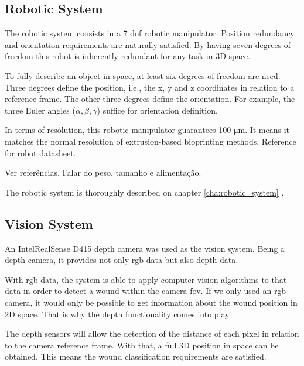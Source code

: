 \subsection*{Robotic System}
\label{subsec:system_architecture_components_robotic_system}

The robotic system consists in a 7 \gls{dof} robotic manipulator. Position redundancy and orientation requirements are naturally satisfied. By having seven degrees of freedom this robot is inherently redundant for any task in 3D space.

To fully describe an object in space, at least six degrees of freedom are need. Three degrees define the position, i.e., the x, y and z coordinates in relation to a reference frame. The other three degrees define the orientation. For example, the three Euler angles ($\alpha, \beta, \gamma$) suffice for orientation definition.

In terms of resolution, this robotic manipulator guarantees 100 \si{\micro\meter}. It means it matches the normal resolution of extrusion-based bioprinting methods. {\color{red}Reference for robot datasheet.}

{\color{red} Ver referências. Falar do peso, tamanho e alimentação.}

The robotic system is thoroughly described on chapter \ref{cha:robotic_system}
.


\subsection*{Vision System}
\label{subsec:system_architecture_components_vision_system}

An Intel\textregistered RealSense\texttrademark{} D415 depth camera was used as the vision system. Being a depth camera, it provides not only \gls{rgb} data but also depth data.

With \gls{rgb} data, the system is able to apply computer vision algorithms to that data in order to detect a wound within the camera \gls{fov}. If we only used an \gls{rgb} camera, it would only be possible to get information about the wound position in 2D space. That is why the depth functionality comes into play.

The depth sensors will allow the detection of the distance of each pixel in relation to the camera reference frame. With that, a full 3D position in space can be obtained. This means the wound classification requirements are satisfied. 

